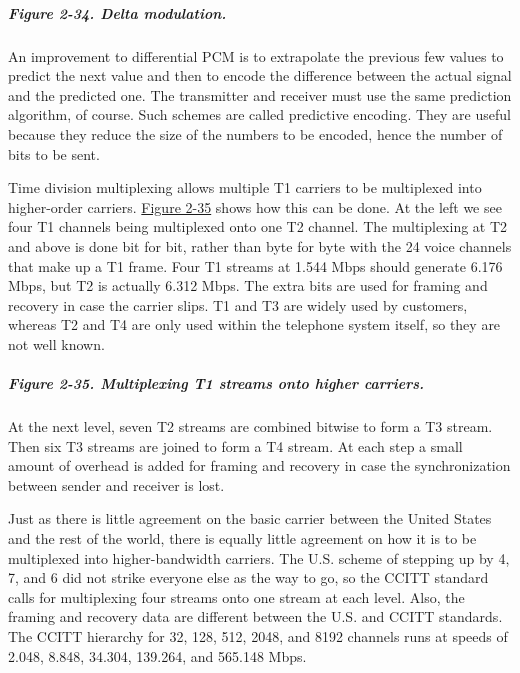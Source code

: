\documentclass[b5paper,11pt]{memoir}
\begin{document}
\subparagraph[Figure 2-34. Delta
modulation.]{\texorpdfstring{\protect\hypertarget{0130661023_ch02lev1sec5.htmlux5cux23ch02fig34}{}{}Figure
2-34. Delta modulation.}{Figure 2-34. Delta modulation.}}


An improvement to differential PCM is to extrapolate the previous few
values to predict the next value and then to encode the difference
between the actual signal and the predicted one. The transmitter and
receiver must use the same prediction algorithm, of course. Such schemes
are called {predictive encoding}. They are useful because they reduce
the size of the numbers to be encoded, hence the number of bits to be
sent.

Time division multiplexing allows multiple T1 carriers to be multiplexed
into higher-order carriers.
\protect\hyperlink{0130661023_ch02lev1sec5.htmlux5cux23ch02fig35}{Figure
2-35} shows how this can be done. At the left we see four T1 channels
being multiplexed onto one T2 channel. The multiplexing at T2 and above
is done bit for bit, rather than byte for byte with the 24 voice
channels that make up a T1 frame. Four T1 streams at 1.544 Mbps should
generate 6.176 Mbps, but T2 is actually 6.312 Mbps. The extra bits are
used for framing and recovery in case the carrier slips. T1 and T3 are
widely used by customers, whereas T2 and T4 are only used within the
telephone system itself, so they are not well known.

\subparagraph[Figure 2-35. Multiplexing T1 streams onto higher
carriers.]{\texorpdfstring{\protect\hypertarget{0130661023_ch02lev1sec5.htmlux5cux23ch02fig35}{}{}Figure
2-35. Multiplexing T1 streams onto higher
carriers.}{Figure 2-35. Multiplexing T1 streams onto higher carriers.}}


At the next level, seven T2 streams are combined bitwise to form a T3
stream. Then six T3 streams are joined to form a T4 stream. At each step
a small amount of overhead is added for framing and recovery in case the
synchronization between sender and receiver is lost.

Just as there is little agreement on the basic carrier between the
United States and the rest of the world, there is equally little
agreement on how it is to be multiplexed into higher-bandwidth carriers.
The U.S. scheme of stepping up by 4, 7, and 6 did not strike everyone
else as the way to go, so the CCITT standard calls for multiplexing four
streams onto one stream at each level. Also, the framing and recovery
data are different between the U.S. and CCITT standards. The CCITT
hierarchy for 32, 128, 512, 2048, and 8192 channels runs at speeds of
2.048, 8.848, 34.304, 139.264, and 565.148 Mbps.
\end{document}
